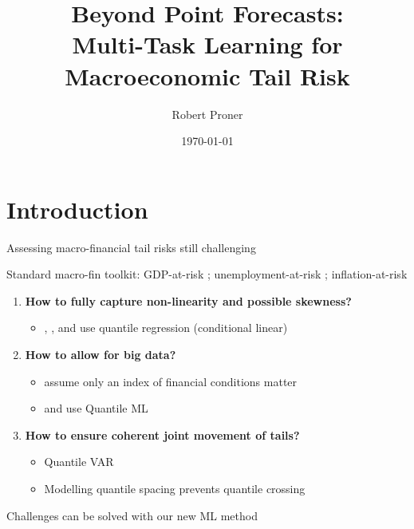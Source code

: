 \documentclass[aspectratio=169]{beamer}
\title{Beyond Point Forecasts: \\Multi-Task Learning for Macroeconomic Tail Risk}
\author[Short names]{
    Robert Proner %
}
\institute[Short inst]{
    University of Toronto
}
\date{\today}
\begin{document}
\maketitle

\section{Introduction}

\begin{frame}{Assessing macro-financial tail risks still challenging}

Standard macro-fin toolkit: GDP-at-risk \parencite{Adrian2019}; unemployment-at-risk \parencite{Kiley2022}; inflation-at-risk \parencite{Lopez-Salido2024}
    \vspace{.4cm}

    \begin{enumerate}
        \item \textbf{How to fully capture non-linearity and possible skewness?}
        \begin{itemize}
            \item \textcite{Adrian2019}, \textcite{Kiley2022}, and \textcite{Lopez-Salido2024} use quantile regression (conditional linear)
        \end{itemize}
        \vspace{.4cm}
        \item \textbf{How to allow for big data?}
        \begin{itemize}
            \item \textcite{Adrian2019} assume only an index of financial conditions matter
            \item \textcite{Adrian2025} and \textcite{Giannone2025} use Quantile ML
        \end{itemize}            
        \vspace{.4cm}
        \item \textbf{How to ensure coherent joint movement of tails?}
        \begin{itemize}
            \item Quantile VAR \parencite{Chavleishvili2024} %
            \item Modelling quantile spacing \parencite{Schmidt2016} prevents quantile crossing
        \end{itemize}
        \vspace{.4cm}
    \end{enumerate}
    Challenges can be solved with our new ML method
\end{frame}
\end{document}
